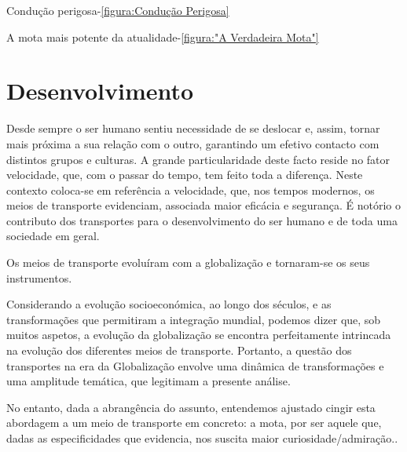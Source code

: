 \documentclass{report}
\begin{document}
Condução perigosa-\autoref{figura:Condução Perigosa}

A mota mais potente da atualidade-\autoref{figura:"A Verdadeira Mota"}





\chapter{Desenvolvimento}
\label{Desenvolvimento}
Desde sempre o ser humano sentiu necessidade de se deslocar e, assim, tornar mais próxima a sua relação com o outro, garantindo um efetivo contacto com distintos grupos e culturas. A grande particularidade deste facto reside no fator velocidade, que, com o passar do tempo, tem feito toda a diferença. Neste contexto coloca-se em referência a velocidade, que, nos tempos modernos, os meios de transporte evidenciam, associada maior eficácia e segurança. É notório o contributo dos transportes para o desenvolvimento do ser humano e de toda uma sociedade em geral.

Os meios de transporte evoluíram com a globalização e tornaram-se os seus instrumentos.

Considerando a evolução socioeconómica, ao longo dos séculos, e as transformações que permitiram a integração mundial, podemos dizer que, sob muitos aspetos, a evolução da globalização se encontra perfeitamente intrincada na evolução dos diferentes meios de transporte. Portanto, a questão dos transportes na era da Globalização envolve uma dinâmica de transformações e uma amplitude temática, que legitimam a presente análise.

No entanto, dada a abrangência do assunto, entendemos ajustado cingir esta abordagem a um meio de transporte em concreto: a mota, por ser aquele que, dadas as especificidades que evidencia, nos suscita maior curiosidade/admiração..\vspace{1mm}
\end{document}
